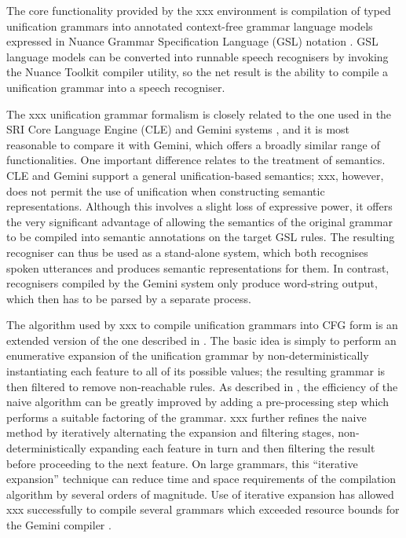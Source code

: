\documentclass[11pt,twoside]{article}
\begin{document}
The core functionality provided by the {\sc xxx} environment is compilation of
typed unification grammars into annotated context-free grammar
language models expressed in Nuance Grammar Specification Language
(GSL) notation \cite{Nuance}. GSL language models can be converted into
runnable speech recognisers by invoking the Nuance Toolkit compiler
utility, so the net result is the ability to compile a unification
grammar into a speech recogniser.

The {\sc xxx} unification grammar formalism is closely related to the
one used in the SRI Core Language Engine (CLE) and Gemini systems
\cite{Alshawi92,DowdingEA93}, and it is most reasonable to compare it
with Gemini, which offers a broadly similar range of functionalities.
One important difference relates to the treatment of
semantics. CLE and Gemini support a general unification-based
semantics; {\sc xxx}, however, does not permit the use of unification
when constructing semantic representations.  Although this involves a slight loss
of expressive power, it offers the very significant advantage of
allowing the semantics of the original grammar to be compiled into
semantic annotations on the target GSL rules. The resulting recogniser
can thus be used as a stand-alone system, which both recognises spoken
utterances and produces semantic representations for them. In
contrast, recognisers compiled by the Gemini system only produce
word-string output, which then has to be parsed by a separate process.

The algorithm used by {\sc xxx} to compile unification grammars into
CFG form is an extended version of the one described in
\cite{RaynerDowdingHockey2001}. The basic idea is simply to perform an
enumerative expansion of the unification grammar by
non-deterministically instantiating each feature to all of its
possible values; the resulting grammar is then filtered to remove
non-reachable rules. As described in \cite{RaynerDowdingHockey2001},
the efficiency of the naive algorithm can be greatly improved by
adding a pre-processing step which performs a suitable factoring of
the grammar. {\sc xxx} further refines the naive method by iteratively
alternating the expansion and filtering stages, non-deterministically
expanding each feature in turn and then filtering the result before
proceeding to the next feature. On large grammars, this ``iterative
expansion'' technique can reduce time and space requirements of the
compilation algorithm by several orders of magnitude. Use of iterative
expansion has allowed {\sc xxx} successfully to compile several
grammars which exceeded resource bounds for the Gemini compiler
\cite{MooreEA97,Moore1998}.
\end{document}
